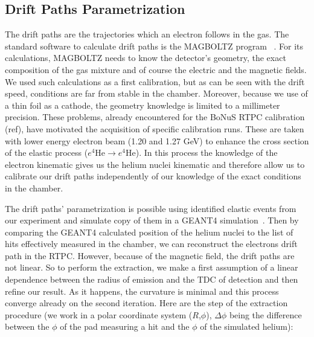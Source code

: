\documentclass[twocolumn,showpacs,superscriptaddress,groupedaddress]{revtex4}
\begin{document}
   
\subsection{Drift Paths Parametrization}

The drift paths are the trajectories which an electron follows in the gas. The 
standard software to calculate drift paths is the MAGBOLTZ program 
~\cite{MAGBOLTZ}. For its calculations, MAGBOLTZ needs to know the detector's 
geometry, the exact composition of the gas mixture and of course the electric 
and the magnetic fields. We used such calculations as a first calibration, but 
as can be seen with the drift speed, conditions are far from stable in the 
chamber. Moreover, because we use of a thin foil as a cathode, the geometry 
knowledge is limited to a millimeter precision. These problems, already 
encountered for the BoNuS RTPC calibration (ref), have motivated the 
acquisition of specific calibration runs. These are taken with lower energy 
electron beam (1.20 and 1.27 GeV) to enhance the cross section of the elastic 
process ($e^{4}$He$\rightarrow e^{4}$He). In this process the knowledge of the 
electron kinematic gives us the helium nuclei kinematic and therefore allow us 
to calibrate our drift paths independently of our knowledge of the exact 
conditions in the chamber.

The drift paths' parametrization is possible using identified elastic events 
from our experiment and simulate copy of them in a GEANT4 
simulation~\cite{GEANT4}. Then by comparing the GEANT4 calculated position of 
the helium nuclei to the list of hits effectively measured in the chamber, we 
can reconstruct the electrons drift path in the RTPC. However, because of the 
magnetic field, the drift paths are not linear. So to perform the extraction, 
we make a first assumption of a linear dependence between the radius of 
emission and the TDC of detection and then refine our result. As it happens, 
the curvature is minimal and this process converge already on the second 
iteration. Here are the step of the extraction procedure (we work in a polar 
coordinate system ($R$,$\phi$), $\Delta\phi$ being the difference between the 
$\phi$ of the pad measuring a hit and the $\phi$ of the simulated helium):
\end{document}

